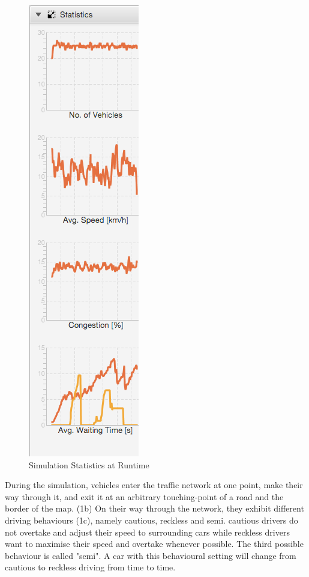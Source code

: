 \begin{figure}
	\begin{center}
		\includegraphics[scale=0.5]{img/graphs.png}
		\caption[Simulation Statistics at Runtime]{Simulation Statistics at Runtime}
		\label{fig:graphs}
	\end{center}
\end{figure}

During the simulation, vehicles enter the traffic network at one point, make their way through it, and exit it at an arbitrary touching-point of a road and the border of the map. (1b) On their way through the network, they exhibit different driving behaviours (1c), namely cautious, reckless and semi. cautious drivers do not overtake and adjust their speed to surrounding cars while reckless drivers want to maximise their speed and overtake whenever possible. The third possible behaviour is called "semi". A car with this behavioural setting will change from cautious to reckless driving from time to time.

